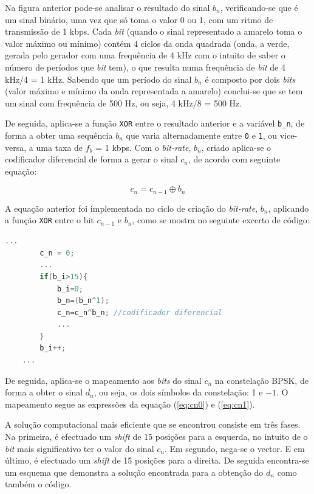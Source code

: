 \documentclass[11pt]{article}
\numberwithin{equation}{section}
\begin{document}
Na figura anterior pode-se analisar o resultado do sinal $b_n$, verificando-se que é um sinal binário, uma vez que só toma o valor 0 ou 1, com um ritmo de transmissão de 1 kbps. Cada \textit{bit} (quando o sinal representado a amarelo toma o valor máximo ou mínimo) contém 4 ciclos da onda quadrada (onda, a verde,  gerada pelo gerador com uma frequência de 4 kHz com o intuito de saber o número de períodos que \textit{bit} tem), o que resulta numa frequência de \textit{bit} de 4 kHz/4 = 1 kHz. Sabendo que um período do sinal $b_n$ é composto por dois \textit{bits} (valor máximo e mínimo da onda representada a amarelo) conclui-se que se tem um sinal com frequência de 500 Hz, ou seja, 4 kHz/8 = 500 Hz.


De seguida, aplica-se a função \texttt{XOR} entre o resultado anterior e a variável \texttt{b\_n}, de forma a obter uma sequência $b_n$ que varia alternadamente entre \texttt{0} e \texttt{1}, ou vice-versa, a uma taxa de $f_b$ = 1 kbps. Com o \textit{bit-rate}, $b_n$, criado aplica-se o codificador diferencial de forma a gerar o sinal $c_n$, de acordo com seguinte equação:

\vspace{-3mm}
\begin{equation}
	c_n = c_{n-1} \oplus b_n
\end{equation} 

\vspace{1mm}
A equação anterior foi implementada no ciclo de criação do \textit{bit-rate}, $b_n$,  aplicando a função \texttt{XOR} entre o bit $c_{n-1}$ e $b_n$, como se mostra no seguinte excerto de código:

\begin{lstlisting}[language=C]
	...
		c_n = 0;
		...
		if(b_i>15){
			b_i=0;
			b_n=(b_n^1);
			c_n=c_n^b_n; //codificador diferencial
			...
		}
		b_i++;
	...
\end{lstlisting}
		
De seguida, aplica-se o mapeamento aos \textit{bits} do sinal $c_n$ na constelação BPSK, de forma a obter o sinal $d_n$, ou seja, os dois símbolos da constelação: 1 e $-1$. O mapeamento segue as expressões da equação (\ref{eq:cn0}) e (\ref{eq:cn1}).
	 
A solução computacional mais eficiente que se encontrou consiste em três fases. Na primeira, é efectuado um \textit{shift} de 15 posições para a esquerda, no intuito de o \textit{bit} mais significativo ter o valor do sinal $c_n$. Em segundo, nega-se o vector. E em último, é efectuado um \textit{shift} de 15 posições para a direita. De seguida encontra-se um esquema que demonstra a solução encontrada para a obtenção do $d_n$ como também o código.
\end{document}
